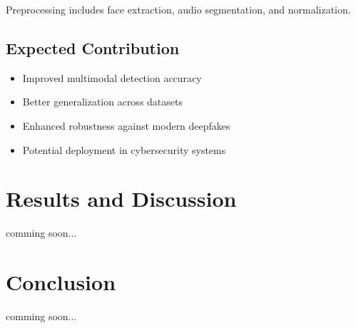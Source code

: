 \documentclass[a4paper, 12pt, oneside]{Thesis}  %
\begin{document}
Preprocessing includes face extraction, audio segmentation, and normalization.

\section{Expected Contribution}
\begin{itemize}
	\item Improved multimodal detection accuracy
	\item Better generalization across datasets
	\item Enhanced robustness against modern deepfakes
	\item Potential deployment in cybersecurity systems
\end{itemize}

\chapter{Results and Discussion} 
\label{ch:results}
comming soon...


\chapter{Conclusion} 
\label{ch:conclusion}
comming soon... 


\clearpage 
{}


\end{document}
